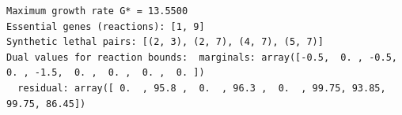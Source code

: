 \documentclass[
  letterpaper,
  DIV=11,
  numbers=noendperiod]{scrartcl}
\begin{document}
\begin{verbatim}
Maximum growth rate G* = 13.5500
Essential genes (reactions): [1, 9]
Synthetic lethal pairs: [(2, 3), (2, 7), (4, 7), (5, 7)]
Dual values for reaction bounds:  marginals: array([-0.5,  0. , -0.5,  0. , -1.5,  0. ,  0. ,  0. ,  0. ])
  residual: array([ 0.  , 95.8 ,  0.  , 96.3 ,  0.  , 99.75, 93.85, 99.75, 86.45])
\end{verbatim}
\end{document}
